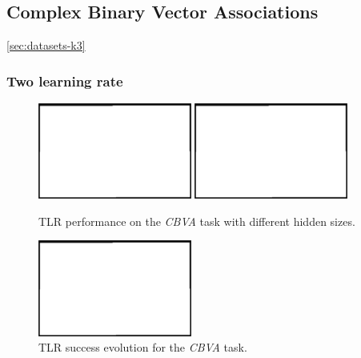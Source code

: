 
\subsection{Complex Binary Vector Associations} 

\ref{sec:datasets-k3} 


\subsubsection{Two learning rate} 
\label{sec:tlr-k3}

\begin{figure}[H]
  \centering
  \includegraphics[width=0.45\textwidth]{img/placeholder.png}   
  \includegraphics[width=0.45\textwidth]{img/placeholder.png}    
  \caption{TLR performance on the \emph{CBVA} task with different hidden sizes.}
  \label{fig:results-tlr-k3-success}
\end{figure}

\begin{figure}[H]
  \centering
  \includegraphics[width=0.45\textwidth]{img/placeholder.png}    
  \caption{TLR success evolution for the \emph{CBVA} task.}
  \label{fig:results-tlr-k3-epoch} 
\end{figure}

